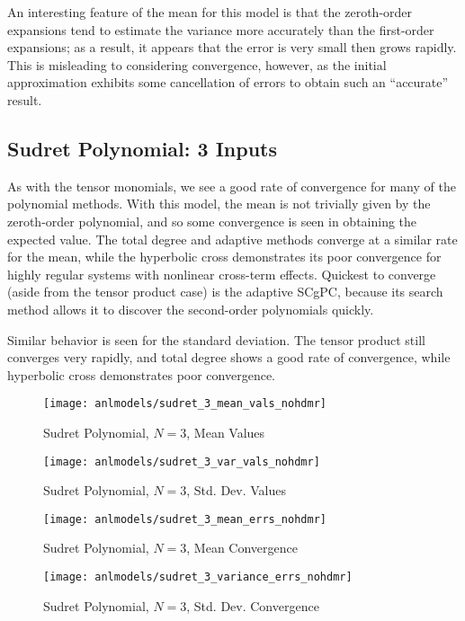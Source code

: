An interesting feature of the mean for
this model is that the zeroth-order expansions tend to estimate the variance more accurately than the
first-order expansions; as a result, it appears that the error is very small then grows rapidly.  This is
misleading to considering convergence, however, as the initial approximation exhibits some cancellation of
errors to obtain such an ``accurate'' result.

\subsection{Sudret Polynomial: 3 Inputs}
As with the tensor monomials, we see a good rate of convergence for many of the polynomial methods.  With
this model, the mean is not trivially given by the zeroth-order polynomial, and so some convergence is seen
in obtaining the expected value.  The total degree and adaptive methods converge at a similar rate for
the mean, while the hyperbolic cross demonstrates its poor convergence for highly regular systems with
nonlinear cross-term effects.  Quickest to converge (aside from the tensor product case) is the adaptive
SCgPC, because its search method allows it to discover the second-order polynomials quickly.

Similar behavior is seen for the standard deviation.
The tensor product still converges very rapidly, and total degree shows a good rate of convergence, while
hyperbolic cross demonstrates poor convergence.
\begin{figure}[H]
  \centering
  \texttt{[image: anlmodels/sudret\_3\_mean\_vals\_nohdmr]}
  \caption{Sudret Polynomial, $N=3$, Mean Values}
  \label{fig:sudretpoly mean values 3}
\end{figure}
\begin{figure}[H]
  \centering
  \texttt{[image: anlmodels/sudret\_3\_var\_vals\_nohdmr]}
  \caption{Sudret Polynomial, $N=3$, Std. Dev. Values}
  \label{fig:sudretpoly var values 3}
\end{figure}

\begin{figure}[H]
  \centering
  \texttt{[image: anlmodels/sudret\_3\_mean\_errs\_nohdmr]}
  \caption{Sudret Polynomial, $N=3$, Mean Convergence}
  \label{fig:sudretpoly mean errors 3}
\end{figure}
\begin{figure}[H]
  \centering
  \texttt{[image: anlmodels/sudret\_3\_variance\_errs\_nohdmr]}
  \caption{Sudret Polynomial, $N=3$, Std. Dev. Convergence}
  \label{fig:sudretpoly var errors 3}
\end{figure}

